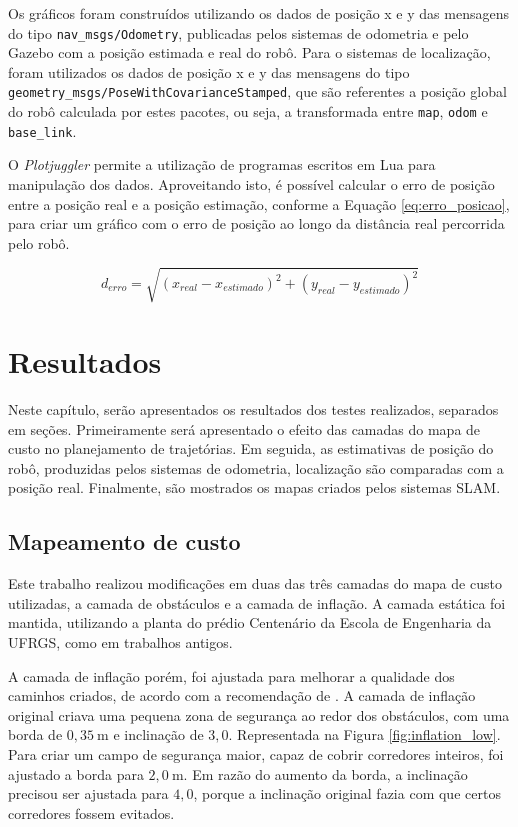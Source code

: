 \documentclass[repeatfields,xlists,xpacks,oneside,yearsonly]{ufrgscca}
\begin{document}
Os gráficos foram construídos utilizando os dados de posição x e y
das mensagens do tipo \texttt{nav\_msgs/Odometry}, publicadas pelos
sistemas de odometria e pelo Gazebo com a posição estimada e real do
robô. Para o sistemas de localização, foram utilizados os dados de
posição x e y das mensagens do tipo
\texttt{geometry\_msgs/PoseWithCovarianceStamped}, que são referentes
a posição global do robô calculada por estes pacotes, ou seja, a
transformada entre \texttt{map}, \texttt{odom} e \texttt{base\_link}.

O \textit{Plotjuggler} permite a utilização de programas escritos em
Lua para manipulação dos dados. Aproveitando isto, é possível
calcular o erro de posição entre a posição real e a posição
estimação, conforme a Equação \ref{eq:erro_posicao}, para criar um
gráfico com o erro de posição ao longo da distância real percorrida
pelo robô.

\begin{equation}
    \label{eq:erro_posicao}
    d_{erro} = \sqrt{(x_{real} - x_{estimado})^2 + (y_{real} - y_{estimado})^2}
\end{equation}

\chapter{Resultados}
\label{resultados}

Neste capítulo, serão apresentados os resultados dos testes
realizados, separados em seções. Primeiramente será apresentado o
efeito das camadas do mapa de custo no planejamento de trajetórias.
Em seguida, as estimativas de posição do robô, produzidas pelos
sistemas de odometria, localização são comparadas com a posição real.
Finalmente, são mostrados os mapas criados pelos sistemas SLAM.

\section{Mapeamento de custo}

Este trabalho realizou modificações em duas das três camadas do mapa
de custo utilizadas, a camada de obstáculos e a camada de inflação. A
camada estática foi mantida, utilizando a planta do prédio Centenário
da Escola de Engenharia da UFRGS, como em trabalhos antigos.

A camada de inflação porém, foi ajustada para melhorar a qualidade
dos caminhos criados, de acordo com a recomendação de
\textcite{ros_tuning_guide}. A camada de inflação original criava uma
pequena zona de segurança ao redor dos obstáculos, com uma borda de
$0,35~\si{\meter}$ e inclinação de $3,0$. Representada na Figura
\ref{fig:inflation_low}. Para criar um campo de segurança maior,
capaz de cobrir corredores inteiros, foi ajustado a borda para
$2,0~\si{\meter}$. Em razão do aumento da borda, a inclinação
precisou ser ajustada para $4,0$, porque a inclinação original fazia
com que certos corredores fossem evitados.
\end{document}
